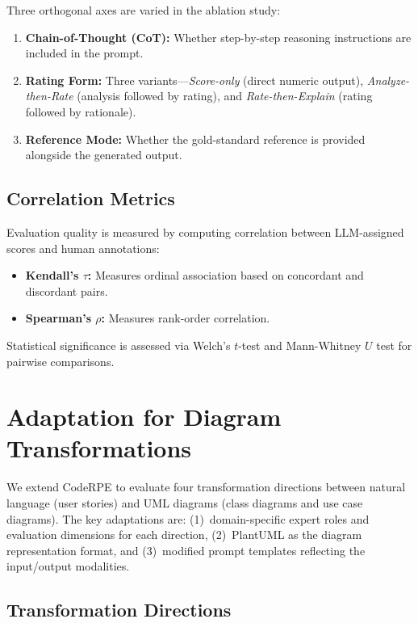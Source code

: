 \documentclass[lettersize,journal]{IEEEtran}
\begin{document}
Three orthogonal axes are varied in the ablation study:

\begin{enumerate}
    \item \textbf{Chain-of-Thought (CoT):} Whether step-by-step reasoning instructions are included in the prompt.
    \item \textbf{Rating Form:} Three variants---\emph{Score-only} (direct numeric output), \emph{Analyze-then-Rate} (analysis followed by rating), and \emph{Rate-then-Explain} (rating followed by rationale).
    \item \textbf{Reference Mode:} Whether the gold-standard reference is provided alongside the generated output.
\end{enumerate}

\subsection{Correlation Metrics}

Evaluation quality is measured by computing correlation between LLM-assigned scores and human annotations:

\begin{itemize}
    \item \textbf{Kendall's $\tau$:} Measures ordinal association based on concordant and discordant pairs.
    \item \textbf{Spearman's $\rho$:} Measures rank-order correlation.
\end{itemize}

Statistical significance is assessed via Welch's $t$-test and Mann-Whitney $U$ test for pairwise comparisons.

\section{Adaptation for Diagram Transformations}
\label{sec:adaptation}

We extend CodeRPE to evaluate four transformation directions between natural language (user stories) and UML diagrams (class diagrams and use case diagrams). The key adaptations are: (1)~domain-specific expert roles and evaluation dimensions for each direction, (2)~PlantUML as the diagram representation format, and (3)~modified prompt templates reflecting the input/output modalities.

\subsection{Transformation Directions}
\end{document}
